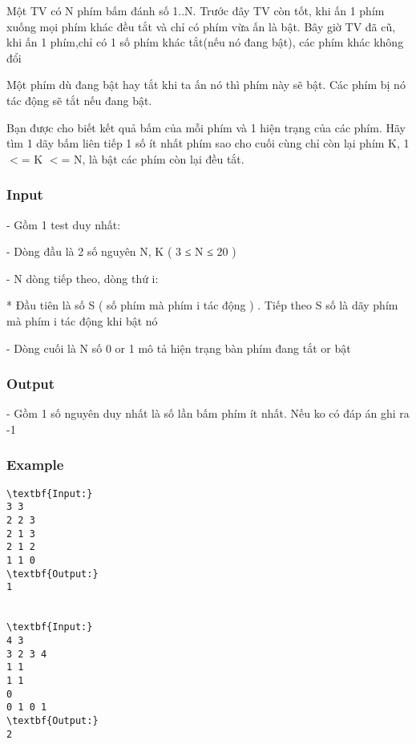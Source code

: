 



   Một TV có N phím bấm đánh số 1..N. Trước đây TV còn tốt, khi ấn 1 phím xuống mọi phím khác đều tắt và chỉ có phím vừa ấn là bật. Bây giờ TV đã cũ, khi ấn 1 phím,chỉ có 1 số phím khác tắt(nếu nó đang bật), các phím khác không đổi  

   Một phím dù đang bật hay tắt khi ta ấn nó thì phím này sẽ bật. Các phím bị nó tác động sẽ tắt nếu đang bật.  

   Bạn được cho biết kết quả bấm của mỗi phím và 1 hiện trạng của các phím. Hãy tìm 1 dãy bấm liên tiếp 1 số ít nhất phím sao cho cuối cùng chỉ còn lại phím K, 1 $<$= K $<$= N, là bật các phím còn lại đều tắt.  

\subsubsection{   Input  }

   - Gồm 1 test duy nhất:  

   - Dòng đầu là 2 số nguyên N, K ( 3 ≤ N ≤ 20 )  

   - N dòng tiếp theo, dòng thứ i:  

   * Đầu tiên là số S ( số phím mà phím i tác động ) . Tiếp theo S số là dãy phím mà phím i tác động khi bật nó  

   - Dòng cuối là N số 0 or 1 mô tả hiện trạng bàn phím đang tắt or bật  

\subsubsection{   Output  }

   - Gồm 1 số nguyên duy nhất là số lần bấm phím ít nhất. Nếu ko có đáp án ghi ra -1  

\subsubsection{   Example  }
\begin{verbatim}
\textbf{Input:}
3 3
2 2 3
2 1 3
2 1 2
1 1 0
\textbf{Output:}
1


\textbf{Input:}
4 3
3 2 3 4
1 1
1 1
0
0 1 0 1
\textbf{Output:}
2

\end{verbatim}